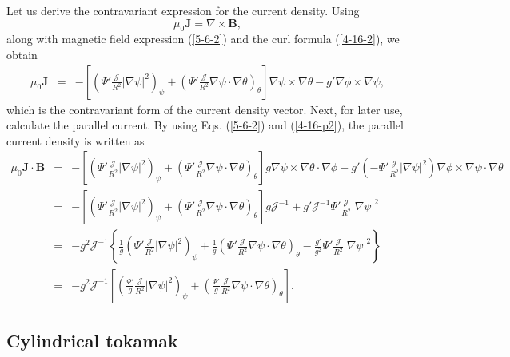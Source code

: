 \documentclass{llncs}
\begin{document}
Let us derive the contravariant expression for the current density. Using
\[ \mu_0 \mathbf{J}= \nabla \times \mathbf{B}, \]
along with magnetic field expression (\ref{5-6-2}) and the curl formula
(\ref{4-16-2}), we obtain
\begin{eqnarray}
  \mu_0 \mathbf{J} & = & - \left[ \left( \Psi' \frac{\mathcal{J}}{R^2} |
  \nabla \psi |^2 \right)_{\psi} + \left( \Psi' \frac{\mathcal{J}}{R^2} \nabla
  \psi \cdot \nabla \theta \right)_{\theta} \right] \nabla \psi \times \nabla
  \theta - g' \nabla \phi \times \nabla \psi,  \label{4-16-p2}
\end{eqnarray}
which is the contravariant form of the current density vector. Next, for later
use, calculate the parallel current. By using Eqs. (\ref{5-6-2}) and
(\ref{4-16-p2}), the parallel current density is written as
\begin{eqnarray}
  \mu_0 \mathbf{J} \cdot \mathbf{B} & = & - \left[ \left( \Psi'
  \frac{\mathcal{J}}{R^2} | \nabla \psi |^2 \right)_{\psi} + \left( \Psi'
  \frac{\mathcal{J}}{R^2} \nabla \psi \cdot \nabla \theta \right)_{\theta}
  \right] g \nabla \psi \times \nabla \theta \cdot \nabla \phi - g' \left( -
  \Psi' \frac{\mathcal{J}}{R^2} | \nabla \psi |^2 \right) \nabla \phi \times
  \nabla \psi \cdot \nabla \theta \nonumber\\
  & = & - \left[ \left( \Psi' \frac{\mathcal{J}}{R^2} | \nabla \psi |^2
  \right)_{\psi} + \left( \Psi' \frac{\mathcal{J}}{R^2} \nabla \psi \cdot
  \nabla \theta \right)_{\theta} \right] g\mathcal{J}^{- 1} + g'
  \mathcal{J}^{- 1} \Psi' \frac{\mathcal{J}}{R^2} | \nabla \psi |^2
  \nonumber\\
  & = & - g^2 \mathcal{J}^{- 1} \left\{ \frac{1}{g} \left( \Psi'
  \frac{\mathcal{J}}{R^2} | \nabla \psi |^2 \right)_{\psi} + \frac{1}{g}
  \left( \Psi' \frac{\mathcal{J}}{R^2} \nabla \psi \cdot \nabla \theta
  \right)_{\theta} - \frac{g'}{g^2} \Psi' \frac{\mathcal{J}}{R^2} | \nabla
  \psi |^2 \right\} \nonumber\\
  & = & - g^2 \mathcal{J}^{- 1} \left[ \left( \frac{\Psi'}{g}
  \frac{\mathcal{J}}{R^2} | \nabla \psi |^2 \right)_{\psi} + \left(
  \frac{\Psi'}{g} \frac{\mathcal{J}}{R^2} \nabla \psi \cdot \nabla \theta
  \right)_{\theta} \right] . 
\end{eqnarray}


\subsection{Cylindrical tokamak}
\end{document}
